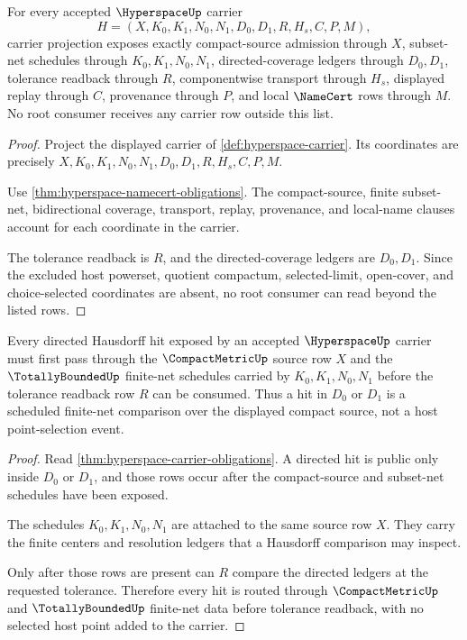 \begin{theorem}
\label{thm:hyperspace-carrier-obligations}
For every accepted $\HyperspaceUp$ carrier
$$
H=(X,K_0,K_1,N_0,N_1,D_0,D_1,R,H_s,C,P,M),
$$
carrier projection exposes exactly compact-source admission through $X$, subset-net schedules through $K_0,K_1,N_0,N_1$, directed-coverage ledgers through $D_0,D_1$, tolerance readback through $R$, componentwise transport through $H_s$, displayed replay through $C$, provenance through $P$, and local $\NameCert$ rows through $M$. No root consumer receives any carrier row outside this list.
\end{theorem}
\begin{proof}
Project the displayed carrier of \autoref{def:hyperspace-carrier}. Its coordinates are precisely $X,K_0,K_1,N_0,N_1,D_0,D_1,R,H_s,C,P,M$.

Use \autoref{thm:hyperspace-namecert-obligations}. The compact-source, finite subset-net, bidirectional coverage, transport, replay, provenance, and local-name clauses account for each coordinate in the carrier.

The tolerance readback is $R$, and the directed-coverage ledgers are $D_0,D_1$. Since the excluded host powerset, quotient compactum, selected-limit, open-cover, and choice-selected coordinates are absent, no root consumer can read beyond the listed rows.
\end{proof}

\begin{theorem}
\label{thm:hyperspace-finite-net-hit}
Every directed Hausdorff hit exposed by an accepted $\HyperspaceUp$ carrier must first pass through the $\CompactMetricUp$ source row $X$ and the $\TotallyBoundedUp$ finite-net schedules carried by $K_0,K_1,N_0,N_1$ before the tolerance readback row $R$ can be consumed. Thus a hit in $D_0$ or $D_1$ is a scheduled finite-net comparison over the displayed compact source, not a host point-selection event.
\end{theorem}
\begin{proof}
Read \autoref{thm:hyperspace-carrier-obligations}. A directed hit is public only inside $D_0$ or $D_1$, and those rows occur after the compact-source and subset-net schedules have been exposed.

The schedules $K_0,K_1,N_0,N_1$ are attached to the same source row $X$. They carry the finite centers and resolution ledgers that a Hausdorff comparison may inspect.

Only after those rows are present can $R$ compare the directed ledgers at the requested tolerance. Therefore every hit is routed through $\CompactMetricUp$ and $\TotallyBoundedUp$ finite-net data before tolerance readback, with no selected host point added to the carrier.
\end{proof}


